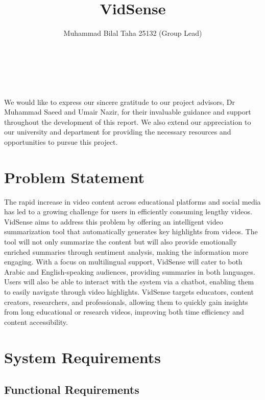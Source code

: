\documentclass{bscs}
\title{VidSense}
\author{Muhammad Bilal Taha 25132 (Group Lead)\\
         [Muhammad Muaz Arif]\\
         [Muhammad Wasay]\\
         [Syed Bilal Ali]\\
         [Ali Iqbal]}
\begin{document}
\frontmatter
\maketitle

\begin{acknowledgement}
We would like to express our sincere gratitude to our project advisors, Dr Muhammad Saeed and 
Umair Nazir, for their invaluable guidance and support throughout the development of this 
report. We also extend our appreciation to our university and department for providing the 
necessary resources and opportunities to pursue this project. 
\end{acknowledgement}

\tableofcontents
\listoftables
{}


\mainmatter
\chapter{Problem Statement}
The rapid increase in video content across educational platforms and social media has led to a growing challenge for users in efficiently consuming lengthy videos. VidSense aims to address this problem by offering an intelligent video summarization tool that automatically generates key highlights from videos. The tool will not only summarize the content but will also provide emotionally enriched summaries through sentiment analysis, making the information more engaging.
With a focus on multilingual support, VidSense will cater to both Arabic and English-speaking audiences, providing summaries in both languages. Users will also be able to interact with the system via a chatbot, enabling them to easily navigate through video highlights.
VidSense targets educators, content creators, researchers, and professionals, allowing them to quickly gain insights from long educational or research videos, improving both time efficiency and content accessibility.



\chapter{System Requirements}

\section{Functional Requirements}
\end{document}
